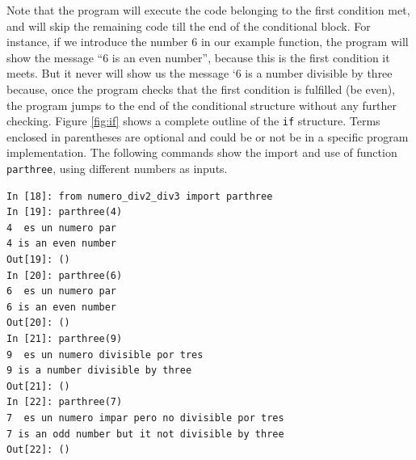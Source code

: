 \begin{paracol}{2}
Note that the program will execute the code belonging to the first condition met, and will skip the remaining code till the end of the conditional block. For instance, if we introduce the number $6$ in our example function, the program will show the message ``6 is an even number'', because this is the first condition it meets. But it never will show us the message `6 is a number divisible by three because, once the program checks that the first condition is fulfilled (be even), the program jumps to the end of the conditional structure without any further checking.  Figure \ref{fig:if} shows a complete outline of the \texttt{if} structure. Terms enclosed in parentheses are optional and could be or not be in a specific program implementation. The following commands show the import and use of function \texttt{parthree}, using different numbers as inputs.
\end{paracol}

\begin{center}
    \begin{minipage}{.5\textwidth}
\begin{verbatim}
In [18]: from numero_div2_div3 import parthree
In [19]: parthree(4)
4  es un numero par
4 is an even number
Out[19]: ()
In [20]: parthree(6)
6  es un numero par
6 is an even number
Out[20]: ()
In [21]: parthree(9)
9  es un numero divisible por tres
9 is a number divisible by three
Out[21]: ()
In [22]: parthree(7)
7  es un numero impar pero no divisible por tres
7 is an odd number but it not divisible by three
Out[22]: ()
\end{verbatim}
\end{minipage}
\end{center}


